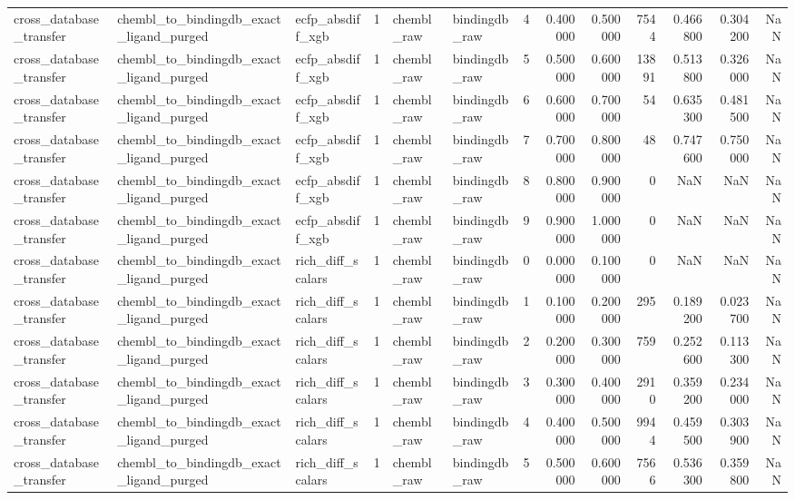 \begin{longtable}{lllrllrrrrrrr}
cross\_database\_transfer & chembl\_to\_bindingdb\_exact\_ligand\_purged & ecfp\_absdiff\_xgb & 1 & chembl\_raw & bindingdb\_raw & 4 & 0.400000 & 0.500000 & 7544 & 0.466800 & 0.304200 & NaN \\
cross\_database\_transfer & chembl\_to\_bindingdb\_exact\_ligand\_purged & ecfp\_absdiff\_xgb & 1 & chembl\_raw & bindingdb\_raw & 5 & 0.500000 & 0.600000 & 13891 & 0.513800 & 0.326000 & NaN \\
cross\_database\_transfer & chembl\_to\_bindingdb\_exact\_ligand\_purged & ecfp\_absdiff\_xgb & 1 & chembl\_raw & bindingdb\_raw & 6 & 0.600000 & 0.700000 & 54 & 0.635300 & 0.481500 & NaN \\
cross\_database\_transfer & chembl\_to\_bindingdb\_exact\_ligand\_purged & ecfp\_absdiff\_xgb & 1 & chembl\_raw & bindingdb\_raw & 7 & 0.700000 & 0.800000 & 48 & 0.747600 & 0.750000 & NaN \\
cross\_database\_transfer & chembl\_to\_bindingdb\_exact\_ligand\_purged & ecfp\_absdiff\_xgb & 1 & chembl\_raw & bindingdb\_raw & 8 & 0.800000 & 0.900000 & 0 & NaN & NaN & NaN \\
cross\_database\_transfer & chembl\_to\_bindingdb\_exact\_ligand\_purged & ecfp\_absdiff\_xgb & 1 & chembl\_raw & bindingdb\_raw & 9 & 0.900000 & 1.000000 & 0 & NaN & NaN & NaN \\
cross\_database\_transfer & chembl\_to\_bindingdb\_exact\_ligand\_purged & rich\_diff\_scalars & 1 & chembl\_raw & bindingdb\_raw & 0 & 0.000000 & 0.100000 & 0 & NaN & NaN & NaN \\
cross\_database\_transfer & chembl\_to\_bindingdb\_exact\_ligand\_purged & rich\_diff\_scalars & 1 & chembl\_raw & bindingdb\_raw & 1 & 0.100000 & 0.200000 & 295 & 0.189200 & 0.023700 & NaN \\
cross\_database\_transfer & chembl\_to\_bindingdb\_exact\_ligand\_purged & rich\_diff\_scalars & 1 & chembl\_raw & bindingdb\_raw & 2 & 0.200000 & 0.300000 & 759 & 0.252600 & 0.113300 & NaN \\
cross\_database\_transfer & chembl\_to\_bindingdb\_exact\_ligand\_purged & rich\_diff\_scalars & 1 & chembl\_raw & bindingdb\_raw & 3 & 0.300000 & 0.400000 & 2910 & 0.359200 & 0.234000 & NaN \\
cross\_database\_transfer & chembl\_to\_bindingdb\_exact\_ligand\_purged & rich\_diff\_scalars & 1 & chembl\_raw & bindingdb\_raw & 4 & 0.400000 & 0.500000 & 9944 & 0.459500 & 0.303900 & NaN \\
cross\_database\_transfer & chembl\_to\_bindingdb\_exact\_ligand\_purged & rich\_diff\_scalars & 1 & chembl\_raw & bindingdb\_raw & 5 & 0.500000 & 0.600000 & 7566 & 0.536300 & 0.359800 & NaN \\

\end{longtable}

